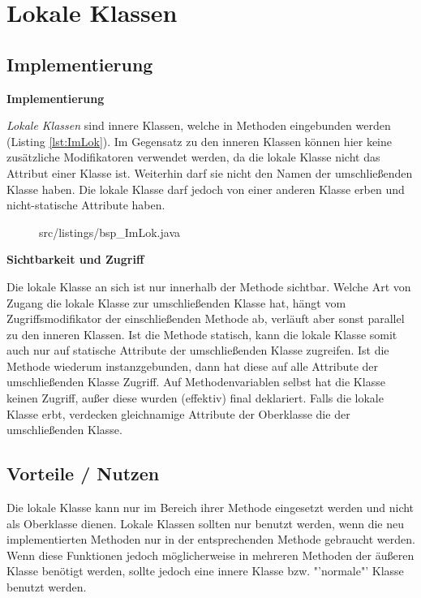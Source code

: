 \section{Lokale Klassen}
\subsection {Implementierung}

{\bf Implementierung}

{\it Lokale Klassen} sind innere Klassen, welche in Methoden eingebunden werden (Listing \ref{lst:ImLok}).
Im Gegensatz zu den inneren Klassen können hier keine zusätzliche Modifikatoren verwendet werden, da die lokale Klasse nicht das Attribut einer Klasse ist.
Weiterhin darf sie nicht den Namen der umschließenden Klasse haben.
Die lokale Klasse darf jedoch von einer anderen Klasse erben und nicht-statische Attribute haben.
\\
\begin{figure}[h]
\lstset{language=Java}
 {src/listings/bsp_ImLok.java}
\end{figure}
\newpage

{\bf Sichtbarkeit und Zugriff}

Die lokale Klasse an sich ist nur innerhalb der Methode sichtbar.
Welche Art von Zugang die lokale Klasse zur umschließenden Klasse hat, hängt vom Zugriffsmodifikator der einschließenden Methode ab, verläuft aber sonst parallel zu den inneren Klassen.
Ist die Methode statisch, kann die lokale Klasse somit auch nur auf statische Attribute der umschließenden Klasse zugreifen.
Ist die Methode wiederum instanzgebunden, dann hat diese auf alle Attribute der umschließenden Klasse Zugriff.
Auf Methodenvariablen selbst hat die Klasse keinen Zugriff, außer diese wurden (effektiv) final deklariert.
Falls die lokale Klasse erbt, verdecken gleichnamige Attribute der Oberklasse die der umschließenden Klasse.

\subsection{Vorteile / Nutzen}

Die lokale Klasse kann nur im Bereich ihrer Methode eingesetzt werden und nicht als Oberklasse dienen.
Lokale Klassen sollten nur benutzt werden, wenn die neu implementierten Methoden nur in der entsprechenden Methode gebraucht werden.
Wenn diese Funktionen jedoch möglicherweise in mehreren Methoden der äußeren Klasse benötigt werden, sollte jedoch eine innere Klasse bzw. "'normale"' Klasse benutzt werden.


